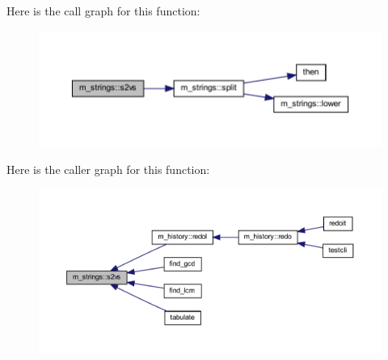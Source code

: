 Here is the call graph for this function\+:
\nopagebreak
\begin{figure}[H]
\begin{center}
\leavevmode
\includegraphics[width=350pt]{namespacem__strings_ad7fffe79559a666aa28e1ed598b8670f_cgraph}
\end{center}
\end{figure}
Here is the caller graph for this function\+:
\nopagebreak
\begin{figure}[H]
\begin{center}
\leavevmode
\includegraphics[width=350pt]{namespacem__strings_ad7fffe79559a666aa28e1ed598b8670f_icgraph}
\end{center}
\end{figure}
\mbox{\label{namespacem__strings_a3f0119fab962146c7656cad592dd9acd}} 
